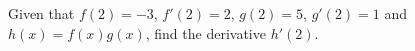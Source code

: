\label{problemFindDerivative(fg),f(2)=-3,f'(2)=2,g(2)=5,g'(2)=1}
Given that  $f(2)=-3$, $f'(2)=2$, $g(2)=5$, $g'(2)=1$ and $h(x)=f(x)g(x)$, find the derivative $h'(2)$.